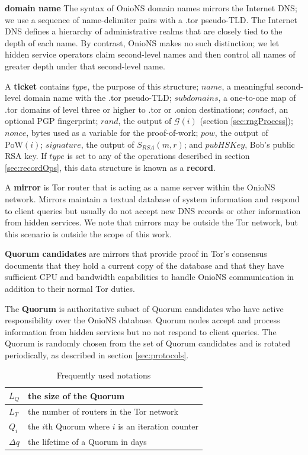 \documentclass[USenglish,oneside,twocolumn]{article}
\begin{document}
\textbf{domain name} The syntax of OnioNS domain names mirrors the Internet DNS; we use a sequence of name-delimiter pairs with a .tor pseudo-TLD. The Internet DNS defines a hierarchy of administrative realms that are closely tied to the depth of each name. By contrast, OnioNS makes no such distinction; we let hidden service operators claim second-level names and then control all names of greater depth under that second-level name.

A \textbf{ticket} contains $ \mathit{type} $, the purpose of this structure; $ \mathit{name} $, a meaningful second-level domain name with the .tor pseudo-TLD; $ \mathit{subdomains} $, a one-to-one map of .tor domains of level three or higher to .tor or .onion destinations; $ \mathit{contact} $, an optional PGP fingerprint; $ \mathit{rand} $, the output of $ \mathcal{G}(i) $ (section \ref{sec:rngProcess}); $ \mathit{nonce} $, bytes used as a variable for the proof-of-work; $ \mathit{pow} $, the output of $ \mathrm{PoW}(i) $; $ \mathit{signature} $, the output of $ S_{\mathit{RSA}}(m, r) $; and $ \mathit{pubHSKey} $, Bob's public RSA key. If $ \mathit{type} $ is set to any of the operations described in section \ref{sec:recordOps}, this data structure is known as a \textbf{record}.

A \textbf{mirror} is Tor router that is acting as a name server within the OnioNS network. Mirrors maintain a textual database of system information and respond to client queries but usually do not accept new DNS records or other information from hidden services. We note that mirrors may be outside the Tor network, but this scenario is outside the scope of this work.

\textbf{Quorum candidates} are mirrors that provide proof in Tor's consensus documents that they hold a current copy of the database and that they have sufficient CPU and bandwidth capabilities to handle OnioNS communication in addition to their normal Tor duties.

The \textbf{Quorum} is authoritative subset of Quorum candidates who have active responsibility over the OnioNS database. Quorum nodes accept and process information from hidden services but no not respond to client queries. The Quorum is randomly chosen from the set of Quorum candidates and is rotated periodically, as described in section \ref{sec:protocols}.

\renewcommand{\arraystretch}{1.2}
\begin{table}[h]
	\small
	\begin{tabularx}{\linewidth}{ | l | X | }
		\hline
    	$ L_{Q} $ & the size of the Quorum \\ \hline
    	$ L_{T} $ & the number of routers in the Tor network \\ \hline
    	$ Q_{i} $ & the $ i $th Quorum where $ i $ is an iteration counter \\ \hline
    	$ \Delta q $ & the lifetime of a Quorum in days \\ \hline
  	\end{tabularx}
  	\vspace{6pt}
  	\caption{Frequently used notations}
\end{table}
\end{document}
